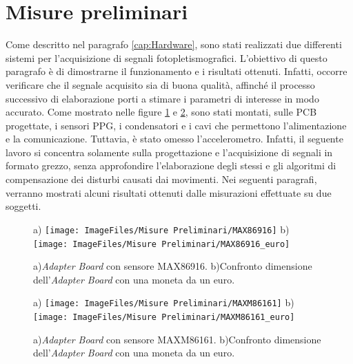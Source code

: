 \clearpage

\section{Misure preliminari}

Come descritto nel paragrafo \ref{cap:Hardware}, sono stati realizzati due differenti sistemi per l'acquisizione di segnali fotopletismografici. L'obiettivo di questo paragrafo è di dimostrarne il funzionamento e i risultati ottenuti. Infatti, occorre verificare che il segnale acquisito sia di buona qualità, affinché il processo successivo di elaborazione porti a stimare i parametri di interesse in modo accurato. Come mostrato nelle figure \ref{fig:foto_moduli_MAX86916} e \ref{fig:foto_moduli_MAXM86161}, sono stati montati, sulle PCB progettate, i sensori PPG, i condensatori e i cavi che permettono l'alimentazione e la comunicazione. Tuttavia, è stato omesso l'accelerometro. Infatti, il seguente lavoro si concentra solamente sulla progettazione e l'acquisizione di segnali in formato grezzo, senza approfondire l'elaborazione degli stessi e gli algoritmi di compensazione dei disturbi causati dai movimenti. Nei seguenti paragrafi, verranno mostrati alcuni risultati ottenuti dalle misurazioni effettuate su due soggetti.

\begin{figure}[bh]
	\centering
	a)
	\texttt{[image: ImageFiles/Misure Preliminari/MAX86916]}
	b)
	\texttt{[image: ImageFiles/Misure Preliminari/MAX86916\_euro]}
	\caption{a)\textit{Adapter Board} con sensore MAX86916. b)Confronto dimensione dell'\textit{Adapter Board} con una moneta da un euro.}
	\label{fig:foto_moduli_MAX86916}
\end{figure}

\begin{figure}[bh]
	\centering
	a)
	\texttt{[image: ImageFiles/Misure Preliminari/MAXM86161]}
	b)
	\texttt{[image: ImageFiles/Misure Preliminari/MAXM86161\_euro]}
	\caption{a)\textit{Adapter Board} con sensore MAXM86161. b)Confronto dimensione dell'\textit{Adapter Board} con una moneta da un euro.}
	\label{fig:foto_moduli_MAXM86161}
\end{figure}

